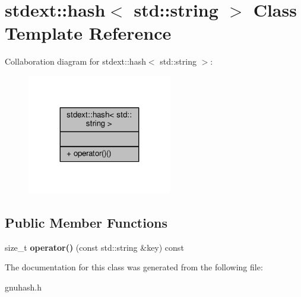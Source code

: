 \hypertarget{classstdext_1_1hash_3_01std_1_1string_01_4}{}\section{stdext\+:\+:hash$<$ std\+:\+:string $>$ Class Template Reference}
\label{classstdext_1_1hash_3_01std_1_1string_01_4}


Collaboration diagram for stdext\+:\+:hash$<$ std\+:\+:string $>$\+:
\nopagebreak
\begin{figure}[H]
\begin{center}
\leavevmode
\includegraphics[width=179pt]{d1/dd9/classstdext_1_1hash_3_01std_1_1string_01_4__coll__graph}
\end{center}
\end{figure}
\subsection*{Public Member Functions}
\begin{DoxyCompactItemize}
\item 
size\+\_\+t {\bfseries operator()} (const std\+::string \&key) const \hypertarget{classstdext_1_1hash_3_01std_1_1string_01_4_ad11bc992adc1034b82fb7e5022b97a3e}{}\label{classstdext_1_1hash_3_01std_1_1string_01_4_ad11bc992adc1034b82fb7e5022b97a3e}

\end{DoxyCompactItemize}


The documentation for this class was generated from the following file\+:\begin{DoxyCompactItemize}
\item 
gnuhash.\+h\end{DoxyCompactItemize}
